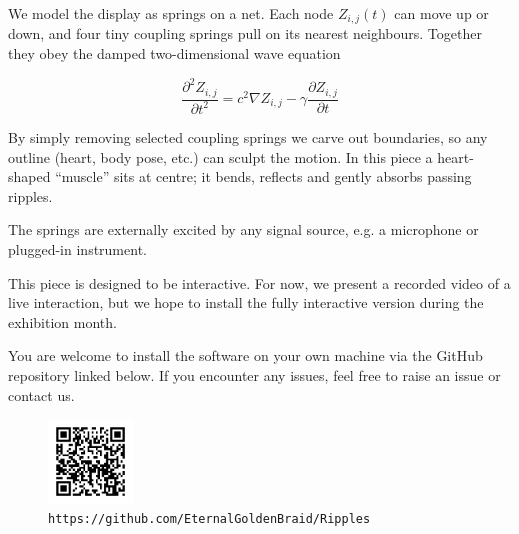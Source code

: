 \documentclass[11pt]{article}
\begin{document}
We model the display as springs on a net.  
Each node $Z_{i,j}(t)$ can move up or down, and four tiny coupling springs pull on its nearest neighbours.  
Together they obey the damped two-dimensional wave equation

\begin{equation*}
    \label{eq:wave}
    \frac{\partial^2 Z_{i,j}}{\partial t^2} = c^2 \nabla Z_{i,j} - \gamma \frac{\partial Z_{i,j}}{\partial t}
\end{equation*}

By simply removing selected coupling springs we carve out boundaries,  
so any outline (heart, body pose, etc.) can sculpt the motion.  
In this piece a heart-shaped “muscle” sits at centre; it bends,  
reflects and gently absorbs passing ripples.

The springs are externally excited by any signal source, e.g. a microphone or plugged-in instrument.

This piece is designed to be interactive. For now, we present a recorded video of a live interaction,  
but we hope to install the fully interactive version during the exhibition month.

You are welcome to install the software on your own machine via the GitHub repository linked below.  
If you encounter any issues, feel free to raise an issue or contact us.

\begin{figure}[h]
    \centering
    \includegraphics[width=0.2\textwidth]{Images/ripples_qr_plain.png}
    \caption*{\texttt{https://github.com/EternalGoldenBraid/Ripples}}
\end{figure}
\end{document}
